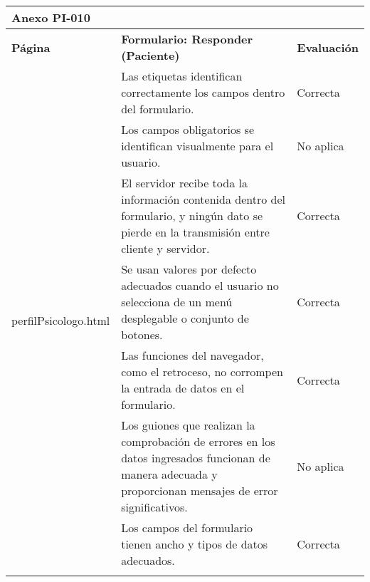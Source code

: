 \begin{table}[htpb]
\centering
\begin{tabularx}{\textwidth}{|l|X|l|}
\hline
\multicolumn{3}{|l|}{\textbf{Anexo PI-010}}                                                                                                                                                                               \\ \hline
\textbf{Página}                        & \textbf{Formulario: Responder (Paciente)}                                                                                                                 & \textbf{Evaluación} \\ \hline
\multirow{10}{*}{perfilPsicologo.html} & Las etiquetas identifican correctamente los campos dentro del formulario.                                                                                 & Correcta            \\ \cline{2-3} 
                                       & Los campos obligatorios se identifican visualmente para el usuario.                                                                                       & No aplica           \\ \cline{2-3} 
                                       & El servidor recibe toda la información contenida dentro del formulario, y ningún dato se pierde en la transmisión entre cliente y servidor.               & Correcta            \\ \cline{2-3} 
                                       & Se usan valores por defecto adecuados cuando el usuario no selecciona de un menú desplegable o conjunto de botones.                                       & Correcta            \\ \cline{2-3} 
                                       & Las funciones del navegador, como el retroceso, no corrompen la entrada de datos en el formulario.                                                        & Correcta            \\ \cline{2-3} 
                                       & Los guiones que realizan la comprobación de errores en los datos ingresados funcionan de manera adecuada y proporcionan mensajes de error significativos. & No aplica           \\ \cline{2-3} 
                                       & Los campos del formulario tienen ancho y tipos de datos adecuados.                                                                                        & Correcta            \\ \cline{2-3} 

\end{tabularx}
\end{table}
